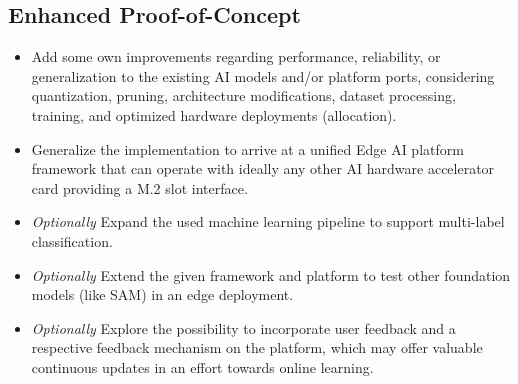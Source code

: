 \subsection*{Enhanced Proof-of-Concept}
\begin{itemize}
    \item Add some own improvements regarding performance, reliability, or generalization to the existing AI models and/or platform ports, considering quantization, pruning, architecture modifications, dataset processing, training, and optimized hardware deployments (allocation).
    \item Generalize the implementation to arrive at a unified Edge AI platform framework that can operate with ideally any other AI hardware accelerator card providing a M.2 slot interface.
    \item \textit{Optionally} Expand the used machine learning pipeline to support multi-label classification.
    \item \textit{Optionally}  Extend the given framework and platform to test other foundation models (like SAM) in an edge deployment.
    \item \textit{Optionally}  Explore the possibility to incorporate user feedback and a respective feedback mechanism on the platform, which may offer valuable continuous updates in an effort towards online learning.
\end{itemize}